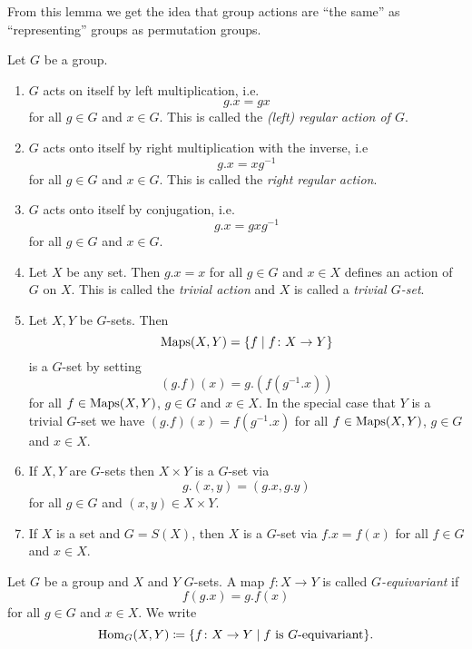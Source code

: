 From this lemma we get the idea that group actions are ``the same'' as ``representing'' groups as permutation groups.


\begin{expls}
  Let $G$ be a group.
  \begin{enumerate}[label=\emph{\alph*)},leftmargin=*]
    \item
      $G$ acts on itself by left multiplication, i.e.
      \[
        g.x = gx
      \]
      for all $g \in G$ and $x \in G$. This is called the \emph{(left) regular action of $G$}.
    \item
      $G$ acts onto itself by right multiplication with the inverse, i.e
      \[
        g.x = xg^{-1}
      \]
      for all $g \in G$ and $x \in G$. This is called the \emph{right regular action}.
    \item
      $G$ acts onto itself by conjugation, i.e.
      \[
        g.x = gxg^{-1}
      \]
      for all $g \in G$ and $x \in G$.
    \item
      Let $X$ be any set. Then $g.x = x$ for all $g \in G$ and $x \in X$ defines an action of $G$ on $X$. This is called the \emph{trivial action} and $X$ is called a \emph{trivial $G$-set}.
    \item
      Let $X, Y$ be $G$-sets. Then
      \[
        \operatorname{Maps}(X,Y) = \{f \mid f \colon X \to Y\}
      \]
      is a $G$-set by setting
      \[
        (g.f)(x) = g.\left(f\left(g^{-1}.x\right)\right)
      \]
      for all $f \in \operatorname{Maps}(X,Y)$, $g \in G$ and $x \in X$. In the special case that $Y$ is a trivial $G$-set we have $(g.f)(x) = f(g^{-1}.x)$ for all $f \in \operatorname{Maps}(X,Y)$, $g \in G$ and $x \in X$.
    \item
      If $X, Y$ are $G$-sets then $X \times Y$ is a $G$-set via
      \[
        g.(x,y) = (g.x,g.y)
      \]
      for all $g \in G$ and $(x,y) \in X \times Y$.
    \item
      If $X$ is a set and $G = S(X)$, then $X$ is a $G$-set via $f.x = f(x)$ for all $f \in G$ and $x \in X$.
  \end{enumerate}
\end{expls}


\begin{defi}
  Let $G$ be a group and $X$ and $Y$ $G$-sets. A map $f \colon X \to Y$ is called \emph{$G$-equivariant} if
  \[
    f(g.x) = g.f(x)
  \]
  for all $g \in G$ and $x \in X$. We write
  \[
    \operatorname{Hom}_G(X,Y) \coloneqq \{f \colon X \to Y \mid f \text{ is $G$-equivariant}\}.
  \]
\end{defi}


